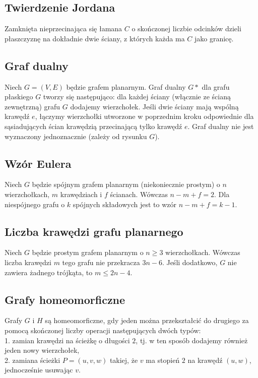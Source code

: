 \subsection*{Twierdzenie Jordana}
Zamknięta nieprzecinająca się łamana $C$ o skończonej liczbie odcinków dzieli
płaszczyznę na dokładnie dwie ściany, z których każda ma $C$ jako granicę.

\subsection*{Graf dualny}
Niech $G = (V, E)$ będzie grafem planarnym. Graf dualny $G*$ dla grafu płaskiego
$G$ tworzy się następująco: dla każdej ściany (włącznie ze ścianą zewnętrzną) grafu
$G$ dodajemy wierzchołek. Jeśli dwie ściany mają wspólną krawędź $e$, łączymy
wierzchołki utworzone w poprzednim kroku odpowiednie dla sąsiadujących ścian
krawędzią przecinającą tylko krawędź $e$. Graf dualny nie jest wyznaczony 
jednoznacznie (zależy od rysunku $G$).

\subsection*{Wzór Eulera}
Niech $G$ będzie spójnym grafem planarnym (niekoniecznie prostym) o $n$ wierzchołkach,
$m$ krawędziach i $f$ ścianach. Wówczas $n - m + f = 2$. Dla niespójnego grafu o $k$
spójnych składowych jest to wzór $n - m + f = k - 1$.

\subsection*{Liczba krawędzi grafu planarnego}
Niech $G$ będzie prostym grafem planarnym o $n \geq 3$ wierzchołkach. Wówczas liczba
krawędzi $m$ tego grafu nie przekracza $3n - 6$. Jeśli dodatkowo, $G$ nie zawiera
żadnego trójkąta, to $m \leq 2n - 4$.

\subsection*{Grafy homeomorficzne}
Grafy $G$ i $H$ są homeomorficzne, gdy jeden można przekształcić do drugiego za pomocą
skończonej liczby operacji następujących dwóch typów: \\
1. zamian krawędzi na ścieżkę o długości $2$, tj. w ten sposób dodajemy również
jeden nowy wierzchołek, \\
2. zamiana ścieżki $P = (u, v, w)$ takiej, że $v$ ma stopień $2$ na krawędź $(u, w)$,
jednocześnie usuwając $v$.

